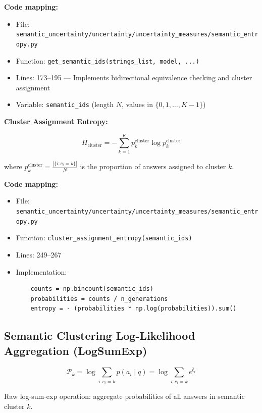 \documentclass{article}
\begin{document}
\textbf{Code mapping:}
\begin{itemize}
    \item File: \texttt{semantic\_uncertainty/uncertainty/uncertainty\_measures/semantic\_entropy.py}
    \item Function: \texttt{get\_semantic\_ids(strings\_list, model, ...)}
    \item Lines: 173--195 --- Implements bidirectional equivalence checking and cluster assignment
    \item Variable: \texttt{semantic\_ids} (length $N$, values in $\{0, 1, \ldots, K-1\}$)
\end{itemize}

\textbf{Cluster Assignment Entropy:}

\begin{equation}
H_{\text{cluster}} = -\sum_{k=1}^{K} p_k^{\text{cluster}} \log p_k^{\text{cluster}}
\label{eq:cluster_entropy}
\end{equation}

where $p_k^{\text{cluster}} = \frac{|\{i : c_i = k\}|}{N}$ is the proportion of answers assigned to cluster $k$.

\textbf{Code mapping:}
\begin{itemize}
    \item File: \texttt{semantic\_uncertainty/uncertainty/uncertainty\_measures/semantic\_entropy.py}
    \item Function: \texttt{cluster\_assignment\_entropy(semantic\_ids)}
    \item Lines: 249--267
    \item Implementation:
    \begin{verbatim}
    counts = np.bincount(semantic_ids)
    probabilities = counts / n_generations
    entropy = - (probabilities * np.log(probabilities)).sum()
    \end{verbatim}
\end{itemize}

\subsection{Semantic Clustering Log-Likelihood Aggregation (LogSumExp)}

\begin{equation}
\mathcal{P}_k = \log \sum_{i : c_i = k} p(a_i \mid q) = \log \sum_{i : c_i = k} e^{\bar{\ell}_i}
\label{eq:logsumexp_raw}
\end{equation}

Raw log-sum-exp operation: aggregate probabilities of all answers in semantic cluster $k$.
\end{document}

